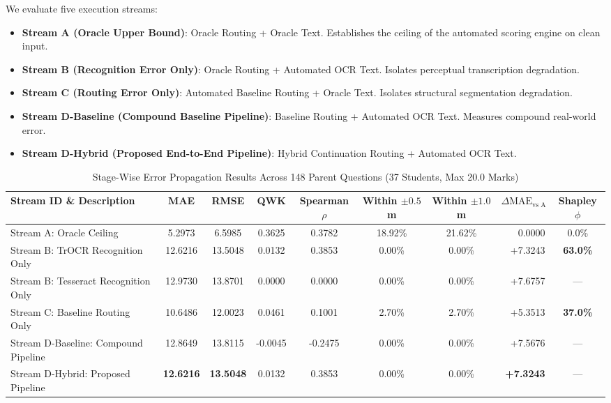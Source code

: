 \documentclass[journal]{IEEEtran}
\begin{document}
We evaluate five execution streams:
\begin{itemize}
    \item \textbf{Stream A (Oracle Upper Bound)}: Oracle Routing + Oracle Text. Establishes the ceiling of the automated scoring engine on clean input.
    \item \textbf{Stream B (Recognition Error Only)}: Oracle Routing + Automated OCR Text. Isolates perceptual transcription degradation.
    \item \textbf{Stream C (Routing Error Only)}: Automated Baseline Routing + Oracle Text. Isolates structural segmentation degradation.
    \item \textbf{Stream D-Baseline (Compound Baseline Pipeline)}: Baseline Routing + Automated OCR Text. Measures compound real-world error.
    \item \textbf{Stream D-Hybrid (Proposed End-to-End Pipeline)}: Hybrid Continuation Routing + Automated OCR Text.
\end{itemize}

\begin{table}[t]
\centering
\caption{Stage-Wise Error Propagation Results Across 148 Parent Questions (37 Students, Max 20.0 Marks)}
\label{tab:stagewise_summary}
\begin{tabular}{lccccccrc}
\toprule
\textbf{Stream ID \& Description} & \textbf{MAE} & \textbf{RMSE} & \textbf{QWK} & \textbf{Spearman $\rho$} & \textbf{Within $\pm0.5$m} & \textbf{Within $\pm1.0$m} & $\Delta\text{MAE}_{\text{vs A}}$ & \textbf{Shapley $\phi$} \\
\midrule
Stream A: Oracle Ceiling & 5.2973 & 6.5985 & 0.3625 & 0.3782 & 18.92\% & 21.62\% & 0.0000 & 0.0\% \\
Stream B: TrOCR Recognition Only & 12.6216 & 13.5048 & 0.0132 & 0.3853 & 0.00\% & 0.00\% & +7.3243 & \textbf{63.0\%} \\
Stream B: Tesseract Recognition Only & 12.9730 & 13.8701 & 0.0000 & 0.0000 & 0.00\% & 0.00\% & +7.6757 & --- \\
Stream C: Baseline Routing Only & 10.6486 & 12.0023 & 0.0461 & 0.1001 & 2.70\% & 2.70\% & +5.3513 & \textbf{37.0\%} \\
Stream D-Baseline: Compound Pipeline & 12.8649 & 13.8115 & -0.0045 & -0.2475 & 0.00\% & 0.00\% & +7.5676 & --- \\
Stream D-Hybrid: Proposed Pipeline & \textbf{12.6216} & \textbf{13.5048} & 0.0132 & 0.3853 & 0.00\% & 0.00\% & \textbf{+7.3243} & --- \\
\bottomrule
\end{tabular}
\end{table}
\end{document}
